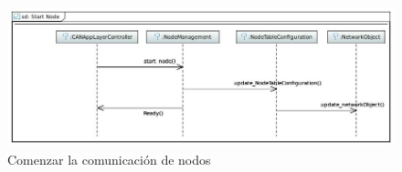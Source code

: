 \begin{figure}[h!]
 \centering
 \includegraphics[scale=0.4]{images/Secciones/AppendixA/Start_Node.JPG}
  \caption{Comenzar la comunicación de nodos}
  \label{fig:StartNode}
\end{figure}























































































